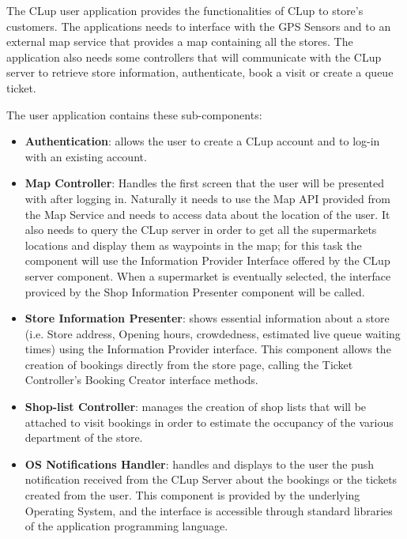 The CLup user application provides the functionalities of CLup to store's customers. The applications needs to interface with the GPS Sensors and to an external map service that provides a map containing all the stores. The application also needs some controllers that will communicate with the CLup server to retrieve store information, authenticate, book a visit or create a queue ticket.

The user application contains these sub-components:
\begin{itemize}
    \item \textbf{Authentication}: allows the user to create a CLup account and to log-in with an existing account.
    \item \textbf{Map Controller}: Handles the first screen that the user will be presented with after logging in. Naturally it needs to use the Map API provided from the Map Service and needs to access data about the location of the user. It also needs to query the CLup server in order to get all the supermarkets locations and display them as waypoints in the map; for this task the component will use the Information Provider Interface offered by the CLup server component. When a supermarket is eventually selected, the interface proviced by the Shop Information Presenter component will be called.
    \item \textbf{Store Information Presenter}: shows essential information about a store (i.e. Store address, Opening hours, crowdedness, estimated live queue waiting times) using the Information Provider interface. This component allows the creation of bookings directly from the store page, calling the Ticket Controller's Booking Creator interface methods.
    \item \textbf{Shop-list Controller}: manages the creation of shop lists that will be attached to visit bookings in order to estimate the occupancy of the various department of the store.
    \item \textbf{OS Notifications Handler}: handles and displays to the user the push notification received from the CLup Server about the bookings or the tickets created from the user. This component is provided by the underlying Operating System, and the interface is accessible through standard libraries of the application programming language.
\end{itemize}

